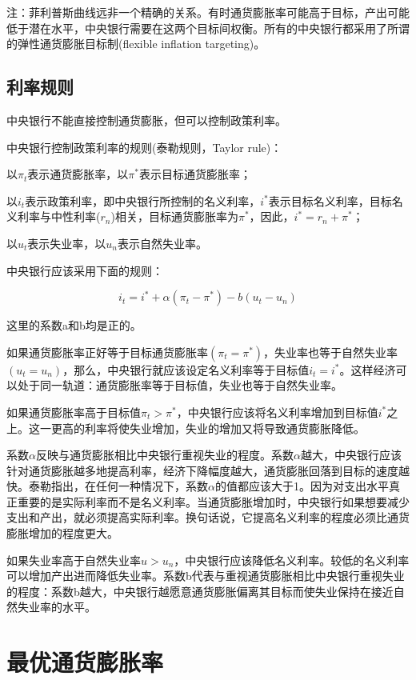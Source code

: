 \documentclass{article}
\begin{document}
注：菲利普斯曲线远非一个精确的关系。有时通货膨胀率可能高于目标，产出可能低于潜在水平，中央银行需要在这两个目标间权衡。所有的中央银行都采用了所谓的弹性通货膨胀目标制(flexible inflation targeting)。

\subsection{利率规则}

中央银行不能直接控制通货膨胀，但可以控制政策利率。

中央银行控制政策利率的规则(泰勒规则，Taylor rule)：

以$ \pi_t $表示通货膨胀率，以$ \pi^* $表示目标通货膨胀率；

以$ i_t $表示政策利率，即中央银行所控制的名义利率，$ i^* $表示目标名义利率，目标名义利率与中性利率($ r_n $)相关，目标通货膨胀率为$ \pi^* $，因此，$ i^*=r_n+\pi^* $；

以$ u_t $表示失业率，以$ u_n $表示自然失业率。

中央银行应该采用下面的规则：

\[
i_t=i^*+\alpha(\pi_t-\pi^*)-b(u_t-u_n)
\]

这里的系数a和b均是正的。

如果通货膨胀率正好等于目标通货膨胀率$ (\pi_t=\pi^*) $，失业率也等于自然失业率$ (u_t=u_n) $，那么，中央银行就应该设定名义利率等于目标值$ i_t=i^* $。这样经济可以处于同一轨道：通货膨胀率等于目标值，失业也等于自然失业率。

如果通货膨胀率高于目标值$ \pi_t>\pi^* $，中央银行应该将名义利率增加到目标值$ i^* $之上。这一更高的利率将使失业增加，失业的增加又将导致通货膨胀降低。

系数$\alpha$反映与通货膨胀相比中央银行重视失业的程度。系数$\alpha$越大，中央银行应该针对通货膨胀越多地提高利率，经济下降幅度越大，通货膨胀回落到目标的速度越快。泰勒指出，在任何一种情况下，系数$\alpha$的值都应该大于1。因为对支出水平真正重要的是实际利率而不是名义利率。当通货膨胀增加时，中央银行如果想要减少支出和产出，就必须提高实际利率。换句话说，它提高名义利率的程度必须比通货膨胀增加的程度更大。

如果失业率高于自然失业率$ u>u_n $，中央银行应该降低名义利率。较低的名义利率可以增加产出进而降低失业率。系数b代表与重视通货膨胀相比中央银行重视失业的程度：系数b越大，中央银行越愿意通货膨胀偏离其目标而使失业保持在接近自然失业率的水平。

\section{最优通货膨胀率}
\end{document}
